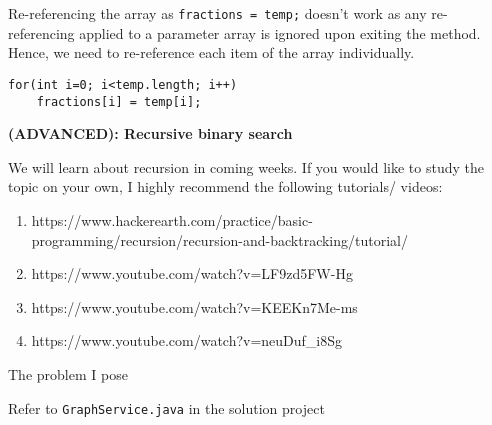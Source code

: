 \begin{questions}
\begin{solution}
Re-referencing the array as \texttt{fractions = temp;} doesn't work as any re-referencing applied to a parameter array is ignored upon exiting the method. Hence, we need to re-reference each item of the array individually.
\begin{lstlisting}
for(int i=0; i<temp.length; i++)
	fractions[i] = temp[i];
\end{lstlisting}
\end{solution}

\question \textbf{(ADVANCED): Recursive binary search} \vskip 0.5cm

We will learn about recursion in coming weeks. If you would like to study the topic on your own, I highly recommend the following tutorials/ videos:

\begin{enumerate}
  \item https://www.hackerearth.com/practice/basic-programming/recursion/recursion-and-backtracking/tutorial/
  \item https://www.youtube.com/watch?v=LF9zd5FW-Hg
  \item https://www.youtube.com/watch?v=KEEKn7Me-ms
  \item https://www.youtube.com/watch?v=neuDuf_i8Sg
\end{enumerate}

The problem I pose 

\begin{solution}
Refer to \texttt{GraphService.java} in the solution project	
\end{solution}
\end{questions}

